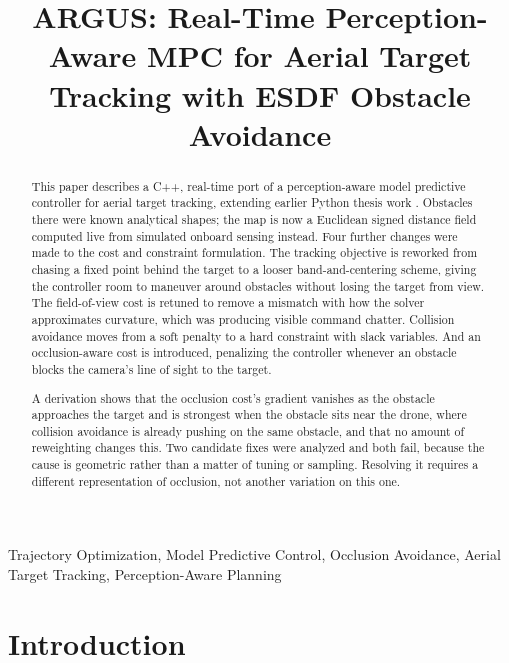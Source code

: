 \documentclass[conference]{IEEEtran}
\begin{document}
\title{ARGUS: Real-Time Perception-Aware MPC for Aerial Target Tracking with ESDF Obstacle Avoidance}

\author{}

\maketitle

\begin{abstract}
This paper describes a C++, real-time port of a perception-aware model predictive controller for aerial target tracking, extending earlier Python thesis work \cite{pinto_thesis}. Obstacles there were known analytical shapes; the map is now a Euclidean signed distance field computed live from simulated onboard sensing instead. Four further changes were made to the cost and constraint formulation. The tracking objective is reworked from chasing a fixed point behind the target to a looser band-and-centering scheme, giving the controller room to maneuver around obstacles without losing the target from view. The field-of-view cost is retuned to remove a mismatch with how the solver approximates curvature, which was producing visible command chatter. Collision avoidance moves from a soft penalty to a hard constraint with slack variables. And an occlusion-aware cost is introduced, penalizing the controller whenever an obstacle blocks the camera's line of sight to the target.

A derivation shows that the occlusion cost's gradient vanishes as the obstacle approaches the target and is strongest when the obstacle sits near the drone, where collision avoidance is already pushing on the same obstacle, and that no amount of reweighting changes this. Two candidate fixes were analyzed and both fail, because the cause is geometric rather than a matter of tuning or sampling. Resolving it requires a different representation of occlusion, not another variation on this one.
\end{abstract}

\begin{IEEEkeywords}
Trajectory Optimization, Model Predictive Control, Occlusion Avoidance, Aerial Target Tracking, Perception-Aware Planning
\end{IEEEkeywords}

\section{Introduction}
\end{document}
